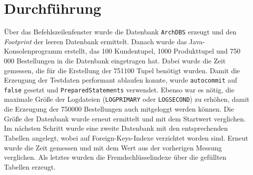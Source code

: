 \chapter{Durchführung}
Über das Befehlszeilenfenster wurde die Datenbank \texttt{ArchDBS} erzeugt und den \textit{Footprint} der leeren Datenbank ermittelt. Danach wurde das Java-Konsolenprogramm erstellt, das 100 Kundentupel, 1000 Produkttupel und 750 000 Bestellungen in die Datenbank eingetragen hat. Dabei wurde die Zeit gemessen, die für die Erstellung der 751100 Tupel benötigt wurden. Damit die Erzeugung der Testdaten performant ablaufen konnte, wurde \texttt{autocommit} auf \texttt{false} gesetzt und \texttt{PreparedStatements} verwendet. Ebenso war es nötig, die maximale Größe der Logdateien (\texttt{LOGPRIMARY} oder \texttt{LOGSECOND}) zu erhöhen, damit die Erzeugung der 750000 Bestellungen auch mitgeloggt werden können. Die Größe der Datenbank wurde erneut ermittelt und mit dem Startwert verglichen.\\

Im nächsten Schritt wurde eine zweite Datenbank mit den entsprechenden Tabellen angelegt, wobei auf Foreign-Keys-Indexe verzichtet worden sind. Erneut wurde die Zeit gemessen und mit dem Wert aus der vorherigen Messung verglichen. Als letztes wurden die Fremdschlüsselindexe über die gefüllten Tabellen erzeugt. 